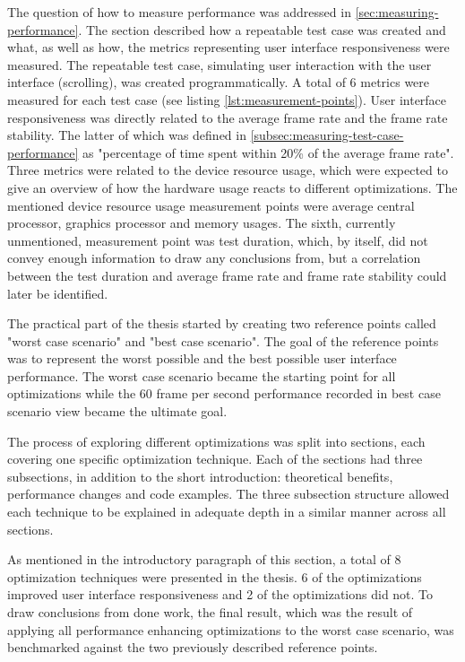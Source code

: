 \documentclass[a4paper,12pt]{article}
\begin{document}
The question of how to measure performance was addressed in \autoref{sec:measuring-performance}. The section described how a repeatable test case was created and what, as well as how, the metrics representing user interface responsiveness were measured. The repeatable test case, simulating user interaction with the user interface (scrolling), was created programmatically. A total of 6 metrics were measured for each test case (see listing \ref{lst:measurement-points}). User interface responsiveness was directly related to the average frame rate and the frame rate stability. The latter of which was defined in \autoref{subsec:measuring-test-case-performance} as "percentage of time spent within 20\% of the average frame rate". Three metrics were related to the device resource usage, which were expected to give an overview of how the hardware usage reacts to different optimizations. The mentioned device resource usage measurement points were average central processor, graphics processor and memory usages. The sixth, currently unmentioned, measurement point was test duration, which, by itself, did not convey enough information to draw any conclusions from, but a correlation between the test duration and average frame rate and frame rate stability could later be identified.

The practical part of the thesis started by creating two reference points called "worst case scenario" and "best case scenario". The goal of the reference points was to represent the worst possible and the best possible user interface performance. The worst case scenario became the starting point for all optimizations while the 60 frame per second performance recorded in best case scenario view became the ultimate goal.

The process of exploring different optimizations was split into sections, each covering one specific optimization technique. Each of the sections had three subsections, in addition to the short introduction: theoretical benefits, performance changes and code examples. The three subsection structure allowed each technique to be explained in adequate depth in a similar manner across all sections.

As mentioned in the introductory paragraph of this section, a total of 8 optimization techniques were presented in the thesis. 6 of the optimizations improved user interface responsiveness and 2 of the optimizations did not. To draw conclusions from done work, the final result, which was the result of applying all performance enhancing optimizations to the worst case scenario, was benchmarked against the two previously described reference points.
\end{document}
